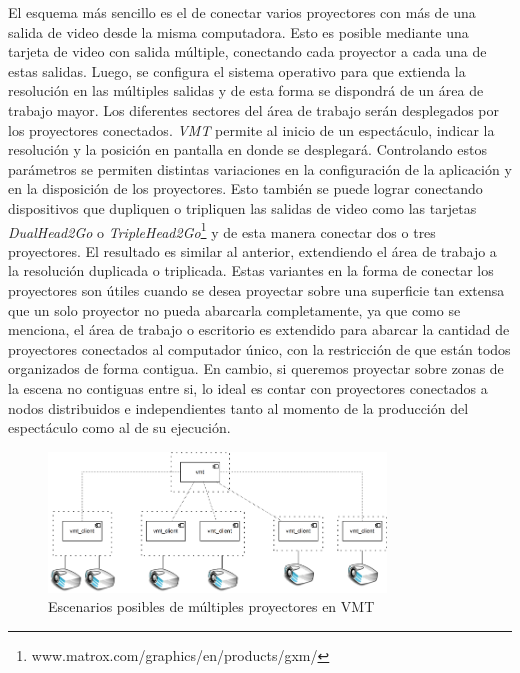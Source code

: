 
El esquema más sencillo es el de conectar varios proyectores con más de una salida de video desde la misma computadora. Esto es posible mediante una tarjeta de video con salida múltiple, conectando cada proyector a cada una de estas salidas. Luego, se configura el sistema operativo para que extienda la resolución en las múltiples salidas y de esta forma se dispondrá de un área de trabajo mayor. Los diferentes sectores del área de trabajo serán desplegados por los proyectores conectados.
\emph{VMT} permite al inicio de un espectáculo, indicar la resolución y la posición en pantalla en donde se desplegará. Controlando estos parámetros se permiten distintas variaciones en la configuración de la aplicación y en la disposición de los proyectores.
Esto también se puede lograr conectando dispositivos que dupliquen o tripliquen las salidas de video como las tarjetas \emph{DualHead2Go} o \emph{TripleHead2Go}\footnote{www.matrox.com/graphics/en/products/gxm/} y de esta manera conectar dos o tres proyectores. El resultado es similar al anterior, extendiendo el área de trabajo a la resolución duplicada o triplicada.
Estas variantes en la forma de conectar los proyectores son útiles cuando se desea proyectar sobre una superficie tan extensa que un solo proyector no pueda abarcarla completamente, ya que como se menciona, el área de trabajo o escritorio es extendido para abarcar la cantidad de proyectores conectados al computador único, con la restricción de que están todos organizados de forma contigua.
En cambio, si queremos proyectar sobre zonas de la escena no contiguas entre si, lo ideal es contar con proyectores conectados a nodos distribuidos e independientes tanto al momento de la producción del espectáculo como al de su ejecución.

\begin{figure}[H]
  \centering
    \includegraphics[width=0.8\textwidth]{./Cap5_vmt/vmt_multiProjector.png}
  \caption[Imagen propia.]{Escenarios posibles de múltiples proyectores en VMT}
  \label{fig:VMT-MultiProjector}
\end{figure}

